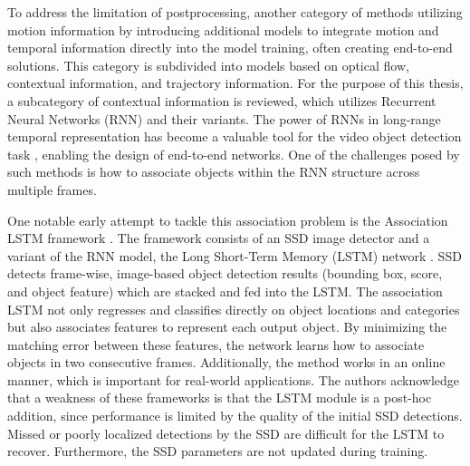 
To address the limitation of postprocessing, another category of methods utilizing motion information by introducing additional models to integrate motion and temporal information directly into the model training, often creating end-to-end solutions. This category is subdivided into models based on optical flow, contextual information, and trajectory information. For the purpose of this thesis, a subcategory of contextual information is reviewed, which utilizes Recurrent Neural Networks (RNN) and their variants. The power of RNNs in long-range temporal representation has become a valuable tool for the video object detection task \cite{Lu_2017_ICCV, xiaoVideoObjectDetection2018, liuMobileVideoObject2018}, enabling the design of end-to-end networks. One of the challenges posed by such methods is how to associate objects within the RNN structure across multiple frames.

One notable early attempt to tackle this association problem is the Association LSTM framework \cite{Lu_2017_ICCV}. The framework consists of an SSD image detector \cite{liuSSDSingleShot2016} and a variant of the RNN model, the Long Short-Term Memory (LSTM) network \cite{6795963}. SSD detects frame-wise, image-based object detection results (bounding box, score, and object feature) which are stacked and fed into the LSTM. The association LSTM not only regresses and classifies directly on object locations and categories but also associates features to represent each output object. By minimizing the matching error between these features, the network learns how to associate objects in two consecutive frames. Additionally, the method works in an online manner, which is important for real-world applications. The authors acknowledge that a weakness of these frameworks is that the LSTM module is a post-hoc addition, since performance is limited by the quality of the initial SSD detections. Missed or poorly localized detections by the SSD are difficult for the LSTM to recover. Furthermore, the SSD parameters are not updated during training.


